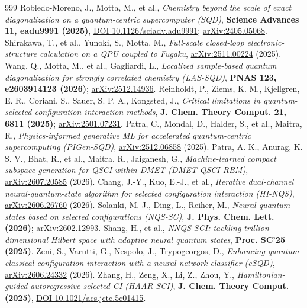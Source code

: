 \documentclass[11pt]{article}
\begin{document}
\begin{thebibliography}{999}
 Robledo-Moreno, J., Motta, M., et al., \emph{Chemistry beyond the scale of exact diagonalization on a quantum-centric supercomputer (SQD)}, \textbf{Science Advances 11, eadu9991 (2025)}, \href{https://doi.org/10.1126/sciadv.adu9991}{DOI 10.1126/sciadv.adu9991}; \href{https://arxiv.org/abs/2405.05068}{arXiv:2405.05068}.
 Shirakawa, T., et al., Yunoki, S., Motta, M., \emph{Full-scale closed-loop electronic-structure calculation on a QPU coupled to Fugaku}, \href{https://arxiv.org/abs/2511.00224}{arXiv:2511.00224} (2025).
 Wang, Q., Motta, M., et al., Gagliardi, L., \emph{Localized sample-based quantum diagonalization for strongly correlated chemistry (LAS-SQD)}, \textbf{PNAS 123, e2603914123 (2026)}; \href{https://arxiv.org/abs/2512.14936}{arXiv:2512.14936}.
 Reinholdt, P., Ziems, K. M., Kjellgren, E. R., Coriani, S., Sauer, S. P. A., Kongsted, J., \emph{Critical limitations in quantum-selected configuration interaction methods}, \textbf{J. Chem. Theory Comput. 21, 6811 (2025)}; \href{https://arxiv.org/abs/2501.07231}{arXiv:2501.07231}.
 Patra, C., Mondal, D., Halder, S., et al., Maitra, R., \emph{Physics-informed generative ML for accelerated quantum-centric supercomputing (PIGen-SQD)}, \href{https://arxiv.org/abs/2512.06858}{arXiv:2512.06858} (2025).
 Patra, A. K., Anurag, K. S. V., Bhat, R., et al., Maitra, R., Jaiganesh, G., \emph{Machine-learned compact subspace generation for QSCI within DMET (DMET-QSCI-RBM)}, \href{https://arxiv.org/abs/2607.20585}{arXiv:2607.20585} (2026).
 Chang, J.-Y., Kuo, E.-J., et al., \emph{Iterative dual-channel neural-quantum-state algorithm for selected configuration interaction (HI-NQS)}, \href{https://arxiv.org/abs/2606.26760}{arXiv:2606.26760} (2026).
 Solanki, M. J., Ding, L., Reiher, M., \emph{Neural quantum states based on selected configurations (NQS-SC)}, \textbf{J. Phys. Chem. Lett. (2026)}; \href{https://arxiv.org/abs/2602.12993}{arXiv:2602.12993}.
 Shang, H., et al., \emph{NNQS-SCI: tackling trillion-dimensional Hilbert space with adaptive neural quantum states}, \textbf{Proc. SC'25 (2025)}.
 Zeni, S., Varutti, G., Nespolo, J., Trypogeorgos, D., \emph{Enhancing quantum-classical configuration interaction with a neural-network classifier (cSQD)}, \href{https://arxiv.org/abs/2606.24332}{arXiv:2606.24332} (2026).
 Zhang, H., Zeng, X., Li, Z., Zhou, Y., \emph{Hamiltonian-guided autoregressive selected-CI (HAAR-SCI)}, \textbf{J. Chem. Theory Comput. (2025)}, \href{https://doi.org/10.1021/acs.jctc.5c01415}{DOI 10.1021/acs.jctc.5c01415}.

\end{thebibliography}
\end{document}

